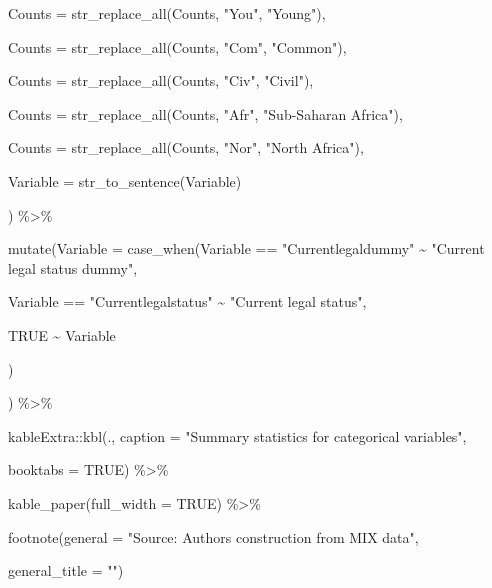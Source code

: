 \documentclass[a4paper,nobind]{templates/ociamthesis}
\newenvironment{Shaded}{\begin{snugshade}}{\end{snugshade}}
\newcommand{\AttributeTok}[1]{\textcolor[rgb]{0.77,0.63,0.00}{#1}}
\newcommand{\ConstantTok}[1]{\textcolor[rgb]{0.00,0.00,0.00}{#1}}
\newcommand{\FunctionTok}[1]{\textcolor[rgb]{0.00,0.00,0.00}{#1}}
\newcommand{\NormalTok}[1]{#1}
\newcommand{\SpecialCharTok}[1]{\textcolor[rgb]{0.00,0.00,0.00}{#1}}
\newcommand{\StringTok}[1]{\textcolor[rgb]{0.31,0.60,0.02}{#1}}
\renewenvironment{Shaded}
{
  \vspace{10pt}%
  \begin{snugshade}%
}{%
  \end{snugshade}%
  \vspace{8pt}%
}
\begin{document}
\begin{Shaded}
\begin{Highlighting}[]
         \AttributeTok{Counts =} \FunctionTok{str\_replace\_all}\NormalTok{(Counts, }\StringTok{"You"}\NormalTok{, }\StringTok{"Young"}\NormalTok{),}
         
         \AttributeTok{Counts =} \FunctionTok{str\_replace\_all}\NormalTok{(Counts, }\StringTok{"Com"}\NormalTok{, }\StringTok{"Common"}\NormalTok{),}
         
         \AttributeTok{Counts =} \FunctionTok{str\_replace\_all}\NormalTok{(Counts, }\StringTok{"Civ"}\NormalTok{, }\StringTok{"Civil"}\NormalTok{), }
         
         \AttributeTok{Counts =} \FunctionTok{str\_replace\_all}\NormalTok{(Counts, }\StringTok{"Afr"}\NormalTok{, }\StringTok{"Sub{-}Saharan Africa"}\NormalTok{),}
         
         \AttributeTok{Counts =} \FunctionTok{str\_replace\_all}\NormalTok{(Counts, }\StringTok{"Nor"}\NormalTok{, }\StringTok{"North Africa"}\NormalTok{), }
         
         \AttributeTok{Variable =} \FunctionTok{str\_to\_sentence}\NormalTok{(Variable)}
         
\NormalTok{         ) }\SpecialCharTok{\%\textgreater{}\%} 
  
\FunctionTok{mutate}\NormalTok{(}\AttributeTok{Variable =} \FunctionTok{case\_when}\NormalTok{(Variable }\SpecialCharTok{==} \StringTok{"Currentlegaldummy"} \SpecialCharTok{\textasciitilde{}} \StringTok{"Current legal status dummy"}\NormalTok{,}
                            
\NormalTok{                            Variable }\SpecialCharTok{==} \StringTok{"Currentlegalstatus"} \SpecialCharTok{\textasciitilde{}} \StringTok{"Current legal status"}\NormalTok{,}
                            
                            \ConstantTok{TRUE} \SpecialCharTok{\textasciitilde{}}\NormalTok{ Variable}
                            
                            
\NormalTok{                            )}
       
       
       
\NormalTok{       ) }\SpecialCharTok{\%\textgreater{}\%} 
  
\NormalTok{kableExtra}\SpecialCharTok{::}\FunctionTok{kbl}\NormalTok{(., }\AttributeTok{caption =} \StringTok{"Summary statistics for categorical variables"}\NormalTok{, }
      
  \AttributeTok{booktabs =} \ConstantTok{TRUE}\NormalTok{) }\SpecialCharTok{\%\textgreater{}\%} 
  
  \FunctionTok{kable\_paper}\NormalTok{(}\AttributeTok{full\_width =} \ConstantTok{TRUE}\NormalTok{) }\SpecialCharTok{\%\textgreater{}\%} 
  
  \FunctionTok{footnote}\NormalTok{(}\AttributeTok{general =} \StringTok{"Source: Authors\textquotesingle{} construction from MIX data"}\NormalTok{,}
           
  \AttributeTok{general\_title =} \StringTok{""}\NormalTok{)}
\end{Highlighting}
\end{Shaded}
\end{document}
